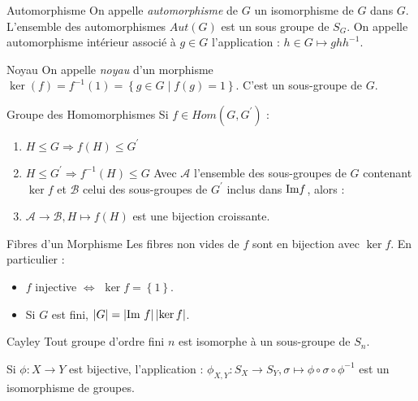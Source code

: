 \documentclass{cours}
\begin{document}
\begin{définition}{Automorphisme}{}
    On appelle \emph{automorphisme} de $G$ un isomorphisme de $G$ dans $G$. L'ensemble des automorphismes $Aut(G)$ est un sous groupe de $S_{G}$. On appelle automorphisme intérieur associé à $g \in G$ l'application : $h \in G \mapsto ghh^{-1}$.
\end{définition}

\begin{définition}{Noyau}{}
    On appelle \emph{noyau} d'un morphisme $\ker(f) = f^{-1}(1) = \left\{g \in G \mid f(g) = 1\right\}$. C'est un sous-groupe de $G$.
\end{définition}

\begin{propositionfr}{Groupe des Homomorphismes}{}
    Si $f \in Hom(G, G^{'})$ :
    \begin{enumerate}
        \item $H \leq G \Rightarrow f(H) \leq G^{'}$
        \item $H \leq G^{'} \Rightarrow f^{-1}(H) \leq G$
              Avec $\mathcal{A}$ l'ensemble des sous-groupes de $G$ contenant $\ker f$ et $\mathcal{B}$ celui des sous-groupes de $G^{'}$ inclus dans $\textmd{Im} f$, alors :
        \item $\mathcal{A} \rightarrow\mathcal{B}, H \mapsto f(H)$ est une bijection croissante.
    \end{enumerate}
\end{propositionfr}

\begin{propositionfr}{Fibres d'un Morphisme}{}
    Les fibres non vides de $f$ sont en bijection avec $\ker f$. En particulier :
    \begin{itemize}
        \item $f$ injective $\Leftrightarrow$ $\ker f = \left\{1\right\}$.
        \item Si $G$ est fini, $\left|G\right| = \left|\text{Im } f\right|\left|\ker f\right|$.
    \end{itemize}
\end{propositionfr}

\begin{théorème}{Cayley}{}
    Tout groupe d'ordre fini $n$ est isomorphe à un sous-groupe de $S_{n}$.
\end{théorème}

\begin{lemma}
    Si $\phi : X \rightarrow Y$ est bijective, l'application : $\phi_{X, Y} : S_{X} \rightarrow S_{Y}, \sigma \mapsto \phi \circ \sigma \circ \phi^{-1}$ est un isomorphisme de groupes.
\end{lemma}
\end{document}
